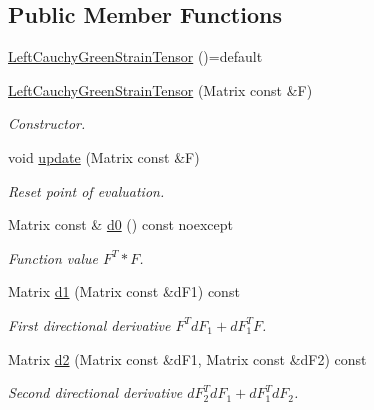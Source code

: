 \subsection*{Public Member Functions}
\begin{DoxyCompactItemize}
\item 
\hyperlink{classFunG_1_1LinearAlgebra_1_1LeftCauchyGreenStrainTensor_af76f7ef68cc45d0d96e3cecd67b14915}{Left\+Cauchy\+Green\+Strain\+Tensor} ()=default
\item 
\hyperlink{classFunG_1_1LinearAlgebra_1_1LeftCauchyGreenStrainTensor_a6bfc0f686be29024dc740630f364d051}{Left\+Cauchy\+Green\+Strain\+Tensor} (Matrix const \&F)
\begin{DoxyCompactList}\small\item\em Constructor. \end{DoxyCompactList}\item 
void \hyperlink{classFunG_1_1LinearAlgebra_1_1LeftCauchyGreenStrainTensor_a3ab24c88bf4e9f9240dee4544027c238}{update} (Matrix const \&F)
\begin{DoxyCompactList}\small\item\em Reset point of evaluation. \end{DoxyCompactList}\item 
Matrix const \& \hyperlink{classFunG_1_1LinearAlgebra_1_1LeftCauchyGreenStrainTensor_a541f165ca20f61eeae1b5cf2d6bc42c6}{d0} () const noexcept
\begin{DoxyCompactList}\small\item\em Function value $ F^T * F $. \end{DoxyCompactList}\item 
Matrix \hyperlink{classFunG_1_1LinearAlgebra_1_1LeftCauchyGreenStrainTensor_a34d6775717ec6b93532d601142a1affc}{d1} (Matrix const \&d\+F1) const 
\begin{DoxyCompactList}\small\item\em First directional derivative $ F^T dF_1 + dF_1^T F $. \end{DoxyCompactList}\item 
Matrix \hyperlink{classFunG_1_1LinearAlgebra_1_1LeftCauchyGreenStrainTensor_ab94232f92cff38c90fd3fbfb28d0fee7}{d2} (Matrix const \&d\+F1, Matrix const \&d\+F2) const 
\begin{DoxyCompactList}\small\item\em Second directional derivative $ dF_2^T dF_1 + dF_1^T dF_2 $. \end{DoxyCompactList}\end{DoxyCompactItemize}


